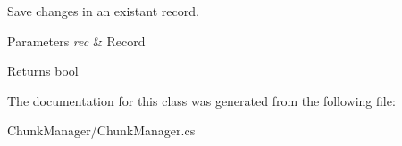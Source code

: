 Save changes in an existant record. 


\begin{DoxyParams}{Parameters}
{\em rec} & Record\\
\hline
\end{DoxyParams}
\begin{DoxyReturn}{Returns}
bool
\end{DoxyReturn}


The documentation for this class was generated from the following file:\begin{DoxyCompactItemize}
\item 
ChunkManager/ChunkManager.cs\end{DoxyCompactItemize}
